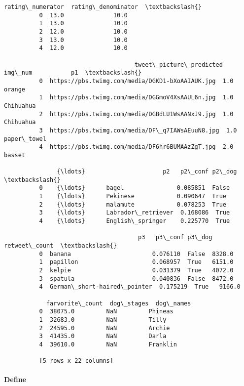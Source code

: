 \documentclass[11pt]{article}
\begin{document}
\begin{Verbatim}[commandchars=\\\{\}]
             rating\_numerator  rating\_denominator  \textbackslash{}
          0  13.0              10.0                 
          1  13.0              10.0                 
          2  12.0              10.0                 
          3  13.0              10.0                 
          4  12.0              10.0                 
          
                                     tweet\_picture\_predicted  img\_num           p1  \textbackslash{}
          0  https://pbs.twimg.com/media/DGKD1-bXoAAIAUK.jpg  1.0      orange        
          1  https://pbs.twimg.com/media/DGGmoV4XsAAUL6n.jpg  1.0      Chihuahua     
          2  https://pbs.twimg.com/media/DGBdLU1WsAANxJ9.jpg  1.0      Chihuahua     
          3  https://pbs.twimg.com/media/DF\_q7IAWsAEuuN8.jpg  1.0      paper\_towel   
          4  https://pbs.twimg.com/media/DF6hr6BUMAAzZgT.jpg  2.0      basset        
          
               {\ldots}                      p2   p2\_conf p2\_dog  \textbackslash{}
          0    {\ldots}      bagel               0.085851  False   
          1    {\ldots}      Pekinese            0.090647  True    
          2    {\ldots}      malamute            0.078253  True    
          3    {\ldots}      Labrador\_retriever  0.168086  True    
          4    {\ldots}      English\_springer    0.225770  True    
          
                                      p3   p3\_conf p3\_dog  retweet\_count  \textbackslash{}
          0  banana                       0.076110  False  8328.0          
          1  papillon                     0.068957  True   6151.0          
          2  kelpie                       0.031379  True   4072.0          
          3  spatula                      0.040836  False  8472.0          
          4  German\_short-haired\_pointer  0.175219  True   9166.0          
          
            farvorite\_count  dog\_stages  dog\_names  
          0  38075.0         NaN         Phineas    
          1  32683.0         NaN         Tilly      
          2  24595.0         NaN         Archie     
          3  41435.0         NaN         Darla      
          4  39610.0         NaN         Franklin   
          
          [5 rows x 22 columns]
\end{Verbatim}
            
    \hypertarget{define}{%
\paragraph{Define}\label{define}}
\end{document}
